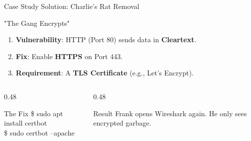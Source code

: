 \documentclass[aspectratio=169]{beamer}  %
\begin{document}
\begin{frame}{Case Study Solution: Charlie's Rat Removal}
    \begin{casesolution}{"The Gang Encrypts"}
        \small
        \begin{enumerate}
            \item \textbf{Vulnerability}: HTTP (Port 80) sends data in \textbf{Cleartext}.
            \item \textbf{Fix}: Enable \textbf{HTTPS} on Port 443.
            \item \textbf{Requirement}: A \textbf{TLS Certificate} (e.g., Let's Encrypt).
        \end{enumerate}
    \end{casesolution}
    
    \begin{columns}[T]
        \begin{column}{0.48\textwidth}
            \begin{block}{The Fix}
                \ttfamily\small
                \$ sudo apt install certbot\\
                \$ sudo certbot --apache
            \end{block}
        \end{column}
        \begin{column}{0.48\textwidth}
            \begin{alertblock}{Result}
                \small
                Frank opens Wireshark again. He only sees encrypted garbage.
            \end{alertblock}
        \end{column}
    \end{columns}
\end{frame}
\end{document}
